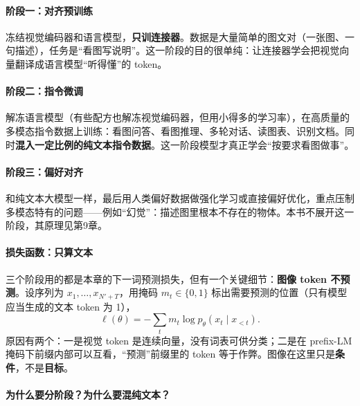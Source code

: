 \paragraph{阶段一：对齐预训练}

冻结视觉编码器和语言模型，\textbf{只训连接器}。数据是大量简单的图文对（一张图、一句描述），任务是“看图写说明”。这一阶段的目的很单纯：让连接器学会把视觉向量翻译成语言模型“听得懂”的 token。

\paragraph{阶段二：指令微调}

解冻语言模型（有些配方也解冻视觉编码器，但用小得多的学习率），在高质量的多模态指令数据上训练：看图问答、看图推理、多轮对话、读图表、识别文档。同时\textbf{混入一定比例的纯文本指令数据}。这一阶段模型才真正学会“按要求看图做事”。

\paragraph{阶段三：偏好对齐}

和纯文本大模型一样，最后用人类偏好数据做强化学习或直接偏好优化，重点压制多模态特有的问题——例如“幻觉”：描述图里根本不存在的物体。本书不展开这一阶段，其原理见第9章。

\paragraph{损失函数：只算文本}

三个阶段用的都是本章的下一词预测损失，但有一个关键细节：\textbf{图像 token 不预测}。设序列为 $x_1, \dots, x_{N'+T}$，用掩码 $m_t \in \{0, 1\}$ 标出需要预测的位置（只有模型应当生成的文本 token 为 1），
\begin{equation}
    \ell(\theta) = -\sum_{t} m_t \log p_\theta(x_t \mid x_{<t}).
\end{equation}
原因有两个：一是视觉 token 是连续向量，没有词表可供分类；二是在 prefix-LM 掩码下前缀内部可以互看，“预测”前缀里的 token 等于作弊。图像在这里只是\textbf{条件}，不是\textbf{目标}。

\paragraph{为什么要分阶段？为什么要混纯文本？}

